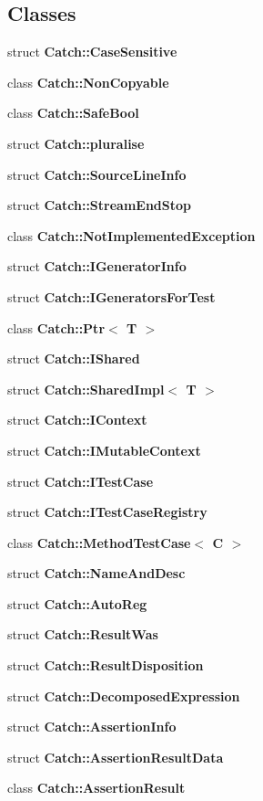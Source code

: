 \subsection*{Classes}
\begin{DoxyCompactItemize}
\item 
struct \textbf{ Catch\+::\+Case\+Sensitive}
\item 
class \textbf{ Catch\+::\+Non\+Copyable}
\item 
class \textbf{ Catch\+::\+Safe\+Bool}
\item 
struct \textbf{ Catch\+::pluralise}
\item 
struct \textbf{ Catch\+::\+Source\+Line\+Info}
\item 
struct \textbf{ Catch\+::\+Stream\+End\+Stop}
\item 
class \textbf{ Catch\+::\+Not\+Implemented\+Exception}
\item 
struct \textbf{ Catch\+::\+I\+Generator\+Info}
\item 
struct \textbf{ Catch\+::\+I\+Generators\+For\+Test}
\item 
class \textbf{ Catch\+::\+Ptr$<$ T $>$}
\item 
struct \textbf{ Catch\+::\+I\+Shared}
\item 
struct \textbf{ Catch\+::\+Shared\+Impl$<$ T $>$}
\item 
struct \textbf{ Catch\+::\+I\+Context}
\item 
struct \textbf{ Catch\+::\+I\+Mutable\+Context}
\item 
struct \textbf{ Catch\+::\+I\+Test\+Case}
\item 
struct \textbf{ Catch\+::\+I\+Test\+Case\+Registry}
\item 
class \textbf{ Catch\+::\+Method\+Test\+Case$<$ C $>$}
\item 
struct \textbf{ Catch\+::\+Name\+And\+Desc}
\item 
struct \textbf{ Catch\+::\+Auto\+Reg}
\item 
struct \textbf{ Catch\+::\+Result\+Was}
\item 
struct \textbf{ Catch\+::\+Result\+Disposition}
\item 
struct \textbf{ Catch\+::\+Decomposed\+Expression}
\item 
struct \textbf{ Catch\+::\+Assertion\+Info}
\item 
struct \textbf{ Catch\+::\+Assertion\+Result\+Data}
\item 
class \textbf{ Catch\+::\+Assertion\+Result}
\item 

\end{DoxyCompactItemize}
